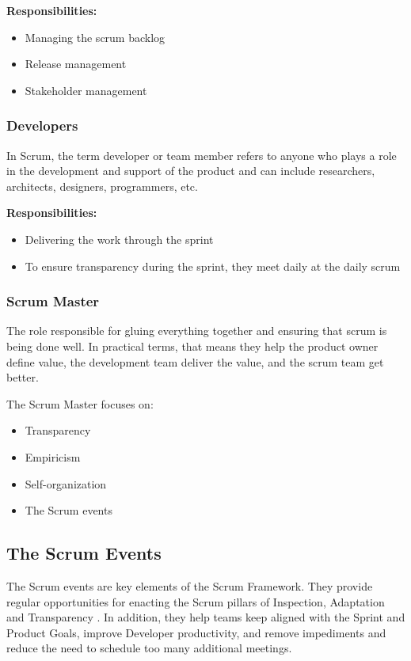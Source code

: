 \textbf{Responsibilities:}
\begin{itemize}
    \item Managing the scrum backlog
    \item Release management
    \item Stakeholder management
\end{itemize}

\subsubsection{Developers}

In Scrum, the term developer or team member refers to anyone who plays a role in the development and support of the product and can include researchers, architects, designers, programmers, etc.

\textbf{Responsibilities:}
\begin{itemize}
    \item Delivering the work through the sprint
    \item To ensure transparency during the sprint, they meet daily at the daily scrum
\end{itemize}

\subsubsection{Scrum Master}

The role responsible for gluing everything together and ensuring that scrum is being done well. In practical terms, that means they help the product owner define value, the development team deliver the value, and the scrum team get better.

The Scrum Master focuses on:
\begin{itemize}
    \item Transparency
    \item Empiricism
    \item Self-organization
    \item The Scrum events
\end{itemize}

\subsection{The Scrum Events}

The Scrum events are key elements of the Scrum Framework. They provide regular opportunities for enacting the Scrum pillars of Inspection, Adaptation and Transparency \cite{ScrumGuide2020}. In addition, they help teams keep aligned with the Sprint and Product Goals, improve Developer productivity, and remove impediments and reduce the need to schedule too many additional meetings.

